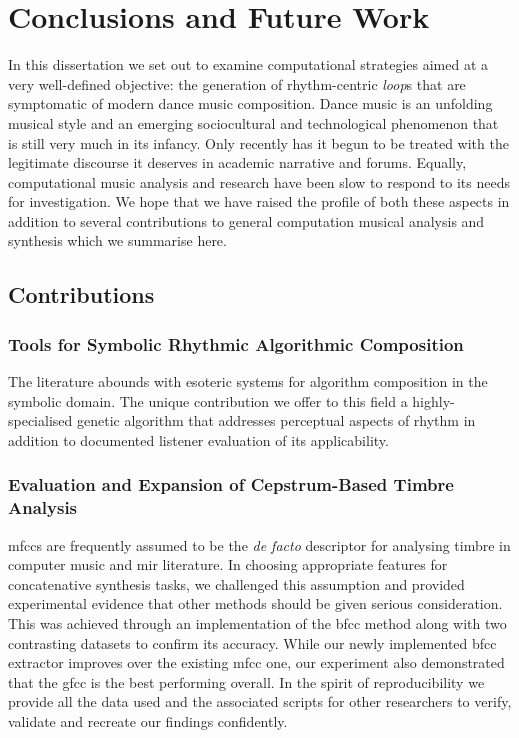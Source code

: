 \chapter{Conclusions and Future Work}
\label{chap:conclusions}

In this dissertation we set out to examine computational strategies aimed at a very well-defined objective: the generation of rhythm-centric \textit{loop}s that are symptomatic of modern dance music composition. Dance music is an unfolding musical style and an emerging sociocultural and technological phenomenon that is still very much in its infancy. Only recently has it begun to be treated with the legitimate discourse it deserves in academic narrative and forums. Equally, computational music analysis and research have been slow to respond to its needs for investigation. We hope that we have raised the profile of both these aspects in addition to several contributions to general computation musical analysis and synthesis which we summarise here.

\section{Contributions} 

\subsection{Tools for Symbolic Rhythmic Algorithmic Composition}

The literature abounds with esoteric systems for algorithm composition in the symbolic domain. The unique contribution we offer to this field a highly-specialised genetic algorithm that addresses perceptual aspects of rhythm in addition to documented listener evaluation of its applicability.

\subsection{Evaluation and Expansion of Cepstrum-Based Timbre Analysis}

\acrshort{mfcc}s are frequently assumed to be the \textit{de facto} descriptor for analysing timbre in computer music and \acrshort{mir} literature. In choosing appropriate features for concatenative synthesis tasks, we challenged this assumption and provided experimental evidence that other methods should be given serious consideration. This was achieved through an implementation of the \acrfull{bfcc} method along with two contrasting datasets to confirm its accuracy. While our newly implemented \acrshort{bfcc} extractor improves over the existing \acrshort{mfcc} one, our experiment also demonstrated that the \acrshort{gfcc} is the best performing overall. In the spirit of reproducibility we provide all the data used and the associated scripts for other researchers to verify, validate and recreate our findings confidently.

